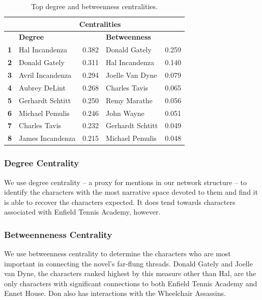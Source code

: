 \begin{table}[]
\begin{tabular}{@{}lllll@{}}
\toprule
 & \multicolumn{4}{c}{\textbf{Centralities}} \\ \midrule
 & \multicolumn{2}{l}{\textbf{Degree}}  & \multicolumn{2}{l}{\textbf{Betweenness}} \\ \midrule
\textbf{1} & Hal Incandenza   & 0.382 & Donald Gately   & 0.259 \\ \midrule
\textbf{2} & Donald Gately    & 0.311 & Hal Incandenza  & 0.140 \\ \midrule
\textbf{3} & Avril Incandenza & 0.294 & Joelle Van Dyne & 0.079 \\ \midrule
\textbf{4} & Aubrey DeLint    & 0.268 & Charles Tavis   & 0.065 \\ \midrule
\textbf{5} & Gerhardt Schtitt & 0.250 & Remy Marathe    & 0.056 \\ \midrule
\textbf{6} & Michael Pemulis  & 0.246 & John Wayne       & 0.051 \\ \midrule
\textbf{7} & Charles Tavis    & 0.232 & Gerhardt Schtitt & 0.049 \\ \midrule
\textbf{8} & James Incandenza & 0.215 & Michael Pemulis  & 0.048 \\ \toprule
\end{tabular}
    \caption{Top degree and betweenness centralities.}
    \label{tab:centralities}

\end{table}

\subsubsection{Degree Centrality}

We use degree centrality -- a proxy for mentions in our network structure -- to identify the characters with the most narrative space devoted to them and find it is able to recover the characters expected. It does tend towards characters associated with Enfield Tennis Academy, however.

\subsubsection{Betweenneness Centrality}
We use betweenness centrality to determine the characters who are most important in connecting the novel's far-flung threads. Donald Gately and Joelle van Dyne, the characters ranked highest by this measure other than Hal, are the only characters with significant connections to both Enfield Tennis Academy and Ennet House. Don also has interactions with the Wheelchair Assassins.

